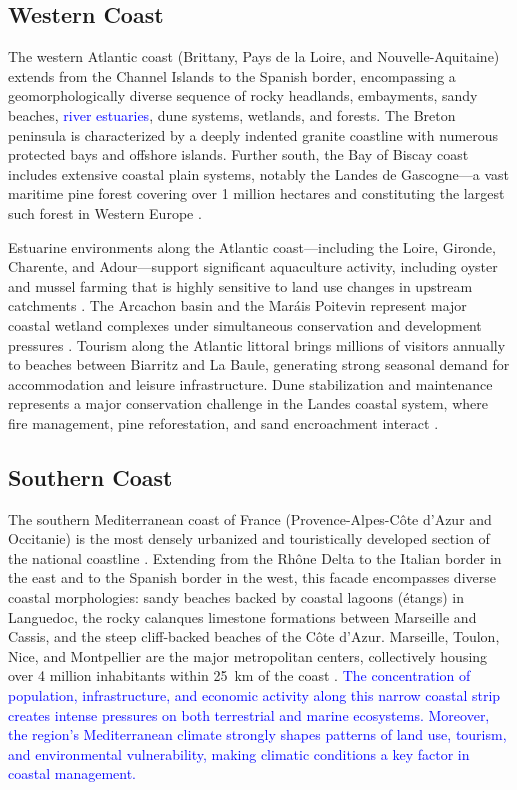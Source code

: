 \documentclass[coasts,article,submit,pdftex,moreauthors]{Definitions/mdpi}
\begin{document}
\subsection{Western Coast}

The western Atlantic coast (Brittany, Pays de la Loire, and Nouvelle-Aquitaine) extends from the Channel Islands to the Spanish border, encompassing a geomorphologically diverse sequence of rocky headlands, embayments, sandy beaches, \textcolor{blue}{river estuaries}, dune systems, wetlands, and forests. The Breton peninsula is characterized by a deeply indented granite coastline with numerous protected bays and offshore islands. Further south, the Bay of Biscay coast includes extensive coastal plain systems, notably the Landes de Gascogne—a vast maritime pine forest covering over 1 million hectares and constituting the largest such forest in Western Europe \citep{augustin2008landes}.

Estuarine environments along the Atlantic coast—including the Loire, Gironde, Charente, and Adour—support significant aquaculture activity, including oyster and mussel farming that is highly sensitive to land use changes in upstream catchments \citep{gueral2008conchyliculture}. The Arcachon basin and the Mar\'ais Poitevin represent major coastal wetland complexes under simultaneous conservation and development pressures \citep{verger2009marais}. Tourism along the Atlantic littoral brings millions of visitors annually to beaches between Biarritz and La Baule, generating strong seasonal demand for accommodation and leisure infrastructure. Dune stabilization and maintenance represents a major conservation challenge in the Landes coastal system, where fire management, pine reforestation, and sand encroachment interact \citep{maugis2011dunes}.

\subsection{Southern Coast}

The southern Mediterranean coast of France (Provence-Alpes-C\^ote d'Azur and Occitanie) is the most densely urbanized and touristically developed section of the national coastline \citep{viard2002tourisme}. Extending from the Rh\^one Delta to the Italian border in the east and to the Spanish border in the west, this facade encompasses diverse coastal morphologies: sandy beaches backed by coastal lagoons (étangs) in Languedoc, the rocky calanques limestone formations between Marseille and Cassis, and the steep cliff-backed beaches of the Côte d'Azur. Marseille, Toulon, Nice, and Montpellier are the major metropolitan centers, collectively housing over 4 million inhabitants within 25~km of the coast \citep{insee2017littoral}. \textcolor{blue}{The concentration of population, infrastructure, and economic activity along this narrow coastal strip creates intense pressures on both terrestrial and marine ecosystems. Moreover, the region's Mediterranean climate strongly shapes patterns of land use, tourism, and environmental vulnerability, making climatic conditions a key factor in coastal management.}
\end{document}
